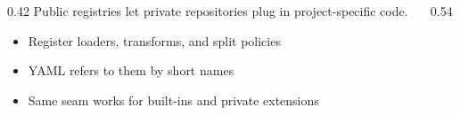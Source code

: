 \begin{frame}

  \vspace{14mm}
  \begin{columns}[T,onlytextwidth]
    \begin{column}{0.42\textwidth}
      {\small Public registries let private repositories plug in project-specific code.}\par
      \vspace{1.5mm}
      \begin{itemize}
        \item Register loaders, transforms, and split policies
        \item YAML refers to them by short names
        \item Same seam works for built-ins and private extensions
      \end{itemize}
    \end{column}
    \begin{column}{0.54\textwidth}
      
    \end{column}
  \end{columns}

  \slideheaderfooter
\end{frame}
